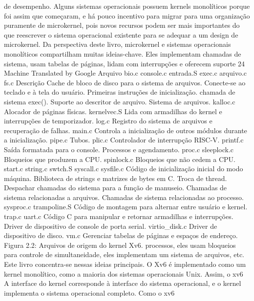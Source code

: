 de  desempenho.  Alguns  sistemas  operacionais  possuem  kernels  monolíticos  porque  foi  assim  que  começaram,  e  há  pouco  
incentivo  para  migrar  para  uma  organização  puramente  de  microkernel,  pois  novos  recursos  podem  ser  mais  importantes  do  que  
reescrever  o  sistema  operacional  existente  para  se  adequar  a  um  design  de  microkernel.
 Da  perspectiva  deste  livro,  microkernel  e  sistemas  operacionais  monolíticos  compartilham  muitas  ideias-chave.  Eles  
implementam  chamadas  de  sistema,  usam  tabelas  de  páginas,  lidam  com  interrupções  e  oferecem  suporte
 24
Machine Translated by Google
 Arquivo
 bio.c  
console.c  
entrada.S
 exec.c
 arquivo.c  fs.c
 Descrição
 Cache  de  bloco  de  disco  para  o  sistema  de  arquivos.
 Conecte-se  ao  teclado  e  à  tela  do  usuário.
 Primeiras  instruções  de  inicialização.
 chamada  de  sistema  exec().
 Suporte  ao  descritor  de  arquivo.
 Sistema  de  arquivos.
 kalloc.c  Alocador  de  páginas  físicas.
 kernelvec.S  Lida  com  armadilhas  do  kernel  e  interrupções  de  temporizador.
 log.c  Registro  do  sistema  de  arquivos  e  recuperação  de  falhas.
 main.c  Controla  a  inicialização  de  outros  módulos  durante  a  inicialização.
 pipe.c  Tubos.
 plic.c  Controlador  de  interrupção  RISC-V.
 printf.c  Saída  formatada  para  o  console.
 Processos  e  agendamento.
 proc.c  
sleeplock.c  Bloqueios  que  produzem  a  CPU.
 spinlock.c  Bloqueios  que  não  cedem  a  CPU.
 start.c  
string.c  
swtch.S  
syscall.c  
sysfile.c
 Código  de  inicialização  inicial  do  modo  máquina.
 Biblioteca  de  strings  e  matrizes  de  bytes  em  C.
 Troca  de  thread.
 Despachar  chamadas  do  sistema  para  a  função  de  manuseio.
 Chamadas  de  sistema  relacionadas  a  arquivos.
 Chamadas  de  sistema  relacionadas  ao  processo.
 sysproc.c  
trampoline.S  Código  de  montagem  para  alternar  entre  usuário  e  kernel.
 trap.c  
uart.c
 Código  C  para  manipular  e  retornar  armadilhas  e  interrupções.
 Driver  de  dispositivo  de  console  de  porta  serial.
 virtio_disk.c  Driver  de  dispositivo  de  disco.
 vm.c
 Gerenciar  tabelas  de  páginas  e  espaços  de  endereço.
 Figura  2.2:  Arquivos  de  origem  do  kernel  Xv6.
 processos,  eles  usam  bloqueios  para  controle  de  simultaneidade,  eles  implementam  um  sistema  de  arquivos,  etc.  Este  livro
 concentra-se  nessas  ideias  principais.
 O  Xv6  é  implementado  como  um  kernel  monolítico,  como  a  maioria  dos  sistemas  operacionais  Unix.  Assim,  o  xv6
 A  interface  do  kernel  corresponde  à  interface  do  sistema  operacional,  e  o  kernel  implementa  o  sistema  operacional  completo.  Como  o  xv6  
